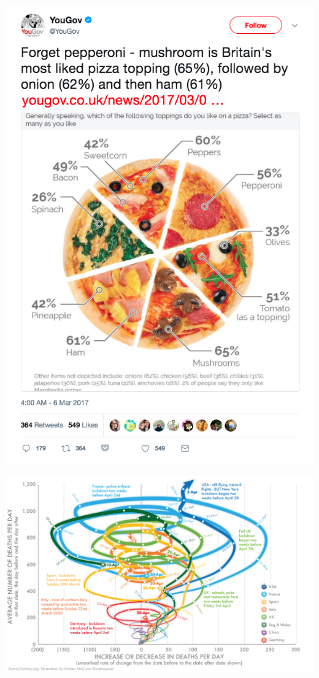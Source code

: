 \documentclass[
]{book}
\begin{document}
\includegraphics{img/vis9.png}

\includegraphics{img/vis10.png}
\end{document}
